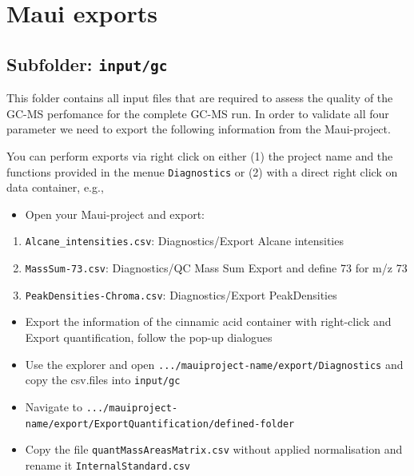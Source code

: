 \documentclass[]{book}
\providecommand{\tightlist}{%
  \setlength{\itemsep}{0pt}\setlength{\parskip}{0pt}}
\theoremstyle{definition}
\theoremstyle{definition}
\theoremstyle{definition}
\theoremstyle{remark}
\begin{document}
\section{Maui exports}\label{mauiexport}

\subsection{\texorpdfstring{Subfolder:
\texttt{input/gc}}{Subfolder: input/gc}}\label{subfolder-inputgc}

This folder contains all input files that are required to assess the
quality of the GC-MS perfomance for the complete GC-MS run. In order to
validate all four parameter we need to export the following information
from the Maui-project.

You can perform exports via right click on either (1) the project name
and the functions provided in the menue \texttt{Diagnostics} or (2) with
a direct right click on data container, e.g.,

\begin{itemize}
\tightlist
\item
  Open your Maui-project and export:
\end{itemize}

\begin{enumerate}
\def\labelenumi{\arabic{enumi}.}
\tightlist
\item
  \texttt{Alcane\_intensities.csv}: Diagnostics/Export Alcane
  intensities
\item
  \texttt{MassSum-73.csv}: Diagnostics/QC Mass Sum Export and define 73
  for m/z 73
\item
  \texttt{PeakDensities-Chroma.csv}: Diagnostics/Export PeakDensities
\end{enumerate}

\begin{itemize}
\tightlist
\item
  Export the information of the cinnamic acid container with right-click
  and Export quantification, follow the pop-up dialogues
\item
  Use the explorer and open
  \texttt{.../mauiproject-name/export/Diagnostics} and copy the
  csv.files into \texttt{input/gc}
\item
  Navigate to
  \texttt{.../mauiproject-name/export/ExportQuantification/defined-folder}
\item
  Copy the file \texttt{quantMassAreasMatrix.csv} without applied
  normalisation and rename it \texttt{InternalStandard.csv}
\end{itemize}
\end{document}
